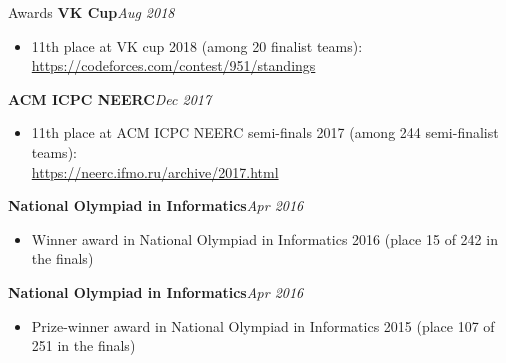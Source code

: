 \documentclass{resume} %
\begin{document}
\begin{rSection}{Awards}
\textbf{VK Cup}\hfill \textit{Aug 2018}
\vspace{-7pt}
\begin{itemize}
    \item 11th place at VK cup 2018 (among 20 finalist teams): \href{https://codeforces.com/contest/951/standings}{https://codeforces.com/contest/951/standings}
\end{itemize}
\textbf{ACM ICPC NEERC}\hfill \textit{Dec 2017}
\vspace{-7pt}
\begin{itemize}
    \item 11th place at ACM ICPC NEERC semi-finals 2017 (among 244 semi-finalist teams):\\ \href{https://neerc.ifmo.ru/archive/2017.html}{https://neerc.ifmo.ru/archive/2017.html}
\end{itemize}

\textbf{National Olympiad in Informatics}\hfill \textit{Apr 2016}
\begin{itemize}
\vspace{-7pt}
    \item Winner award in National Olympiad in Informatics 2016 (place 15 of 242 in the finals)
\end{itemize}

\textbf{National Olympiad in Informatics}\hfill \textit{Apr 2016}
\begin{itemize}
\vspace{-7pt}
    \item Prize-winner award in National Olympiad in Informatics 2015 (place 107 of 251 in the finals)
\end{itemize}

\end{rSection}
\end{document}

